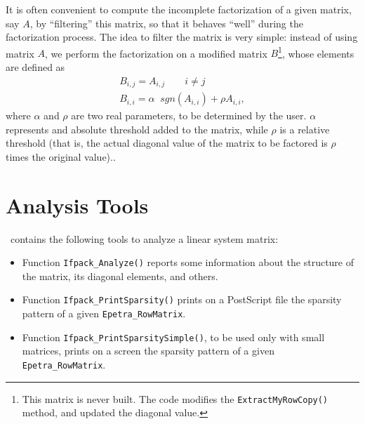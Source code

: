 


\smallskip

It is often convenient to compute the incomplete factorization of a given
matrix, say $A$, by ``filtering'' this matrix, so that it behaves ``well''
during the factorization process. The idea to filter the matrix is very
simple: instead of using matrix $A$, we perform the factorization  on 
a modified matrix $B$\footnote{This matrix is never built. The code modifies
  the {\tt ExtractMyRowCopy()} method, and updated the diagonal value.}, whose elements are defined as
\begin{equation}
\label{eq:B}
\begin{array}{lcr}
B_{i,j} = A_{i,j} \quad \quad i \neq j \\
B_{i,i} = \alpha \; \; sgn(A_{i,i}) + \rho A_{i,i},
  \end{array}
\end{equation}
where $\alpha$ and $\rho$ are two real parameters, to be determined by the
user. $\alpha$ represents and absolute threshold added to the matrix, while
$\rho$ is a relative threshold (that is, the actual diagonal value of the matrix to
be factored is $\rho$ times the original value).. 





\section{Analysis Tools}
\label{sec:analysis}

\ifpack\ contains the following tools to analyze a linear system matrix:
\begin{itemize}
\item Function {\tt Ifpack\_Analyze()} reports some information about the
structure of the matrix, its diagonal elements, and others.
\item Function {\tt Ifpack\_PrintSparsity()} prints on a PostScript file the
sparsity pattern of a given {\tt Epetra\_RowMatrix}.
\item Function {\tt Ifpack\_PrintSparsitySimple()}, to be used only with small
matrices, prints on a screen the
sparsity pattern of a given {\tt Epetra\_RowMatrix}.
\end{itemize}

